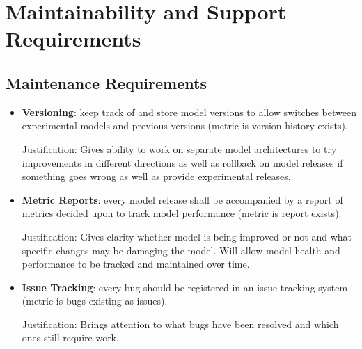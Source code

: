 \documentclass[12pt]{article}
\begin{document}
\section{Maintainability and Support Requirements}
\subsection{Maintenance Requirements}
\begin{itemize}
    \item \textbf{Versioning}: keep track of and store model versions to allow
     switches between experimental models and previous versions (metric is 
     version history exists).

    Justification: Gives ability to work on separate model architectures to try 
    improvements in different directions as well as rollback on model releases 
    if something goes wrong as well as provide experimental releases.
    
    \item \textbf{Metric Reports}: every model release shall be accompanied by 
    a report of metrics decided upon to track model performance (metric is 
    report exists).

    Justification: Gives clarity whether model is being improved or not and what
     specific changes may be damaging the model. Will allow model health and 
     performance to be tracked and maintained over time.

    \item \textbf{Issue Tracking}: every bug should be registered in an issue 
    tracking system (metric is bugs existing as issues). 

    Justification: Brings attention to what bugs have been resolved and which 
    ones still require work.
    
\end{itemize}
\end{document}
